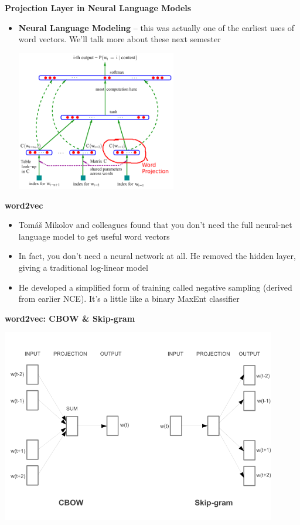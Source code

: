 \documentclass{beamer}
\newcommand{\pagestepalt}[2]{
  \begin{frame}[t]
    \begin{minipage}[t][0.26\textheight][t]{\textwidth}
      \begin{center}
        \huge
        \textbf{#1}
      \end{center}
    \end{minipage}
    
    \begin{minipage}[t][0.7\textheight][c]{\textwidth}
      #2
    \end{minipage}
  \end{frame}
}
\begin{document}
\pagestepalt{Projection Layer in Neural Language Models}{
\begin{itemize}
	\item \textbf{Neural Language Modeling} -- this was actually one of the earliest uses of word vectors.  We'll talk more about these next semester \\
		\begin{center}
		\includegraphics[width=0.55\textwidth]{../images/bengio-etal2003_pg6_image_alt.pdf}
		\end{center}
\end{itemize}
}


\pagestepalt{word2vec}{
\begin{itemize}
	\item Tom\'{a}\v{s} Mikolov and colleagues found that you don't need the full neural-net language model to get useful word vectors
	\pause
	\item In fact, you don't need a neural network at all. He removed the hidden layer, giving a traditional log-linear model
	\pause
	\item He developed a simplified form of training called negative sampling (derived from earlier NCE).  It's a little like a binary MaxEnt classifier
\end{itemize}
}


\pagestepalt{word2vec: CBOW \& Skip-gram}{
\includegraphics[width=0.90\textwidth]{../images/mikolov-etal2013b_fig1.png}
}
\end{document}

